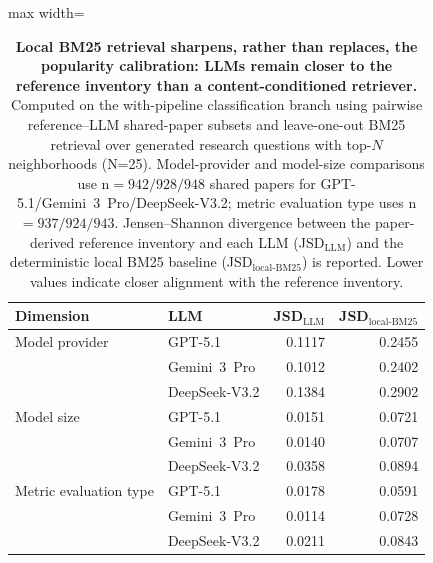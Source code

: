 \begin{table}[H]
\centering
\caption{\textbf{Local BM25 retrieval sharpens, rather than replaces, the popularity calibration: LLMs remain closer to the reference inventory than a content-conditioned retriever.} Computed on the with-pipeline classification branch using pairwise reference--LLM shared-paper subsets and leave-one-out BM25 retrieval over generated research questions with top-$N$ neighborhoods (N=25). Model-provider and model-size comparisons use n$=942/928/948$ shared papers for GPT-5.1/Gemini~3~Pro/DeepSeek-V3.2; metric evaluation type uses n$=937/924/943$. Jensen--Shannon divergence between the paper-derived reference inventory and each LLM (JSD$_{\mathrm{LLM}}$) and the deterministic local BM25 baseline (JSD$_{\mathrm{local\text{-}BM25}}$) is reported. Lower values indicate closer alignment with the reference inventory.}
\label{tab:local_retrieval_baseline}
\begin{adjustbox}{max width=\textwidth}
\footnotesize
\begin{tabular}{llrr}
\toprule
Dimension & LLM & JSD$_{\mathrm{LLM}}$ & JSD$_{\mathrm{local\text{-}BM25}}$ \\
\midrule
Model provider & GPT-5.1 & 0.1117 & 0.2455 \\
 & Gemini~3~Pro & 0.1012 & 0.2402 \\
 & DeepSeek-V3.2 & 0.1384 & 0.2902 \\
Model size & GPT-5.1 & 0.0151 & 0.0721 \\
 & Gemini~3~Pro & 0.0140 & 0.0707 \\
 & DeepSeek-V3.2 & 0.0358 & 0.0894 \\
Metric evaluation type & GPT-5.1 & 0.0178 & 0.0591 \\
 & Gemini~3~Pro & 0.0114 & 0.0728 \\
 & DeepSeek-V3.2 & 0.0211 & 0.0843 \\
\bottomrule
\end{tabular}
\end{adjustbox}
\end{table}